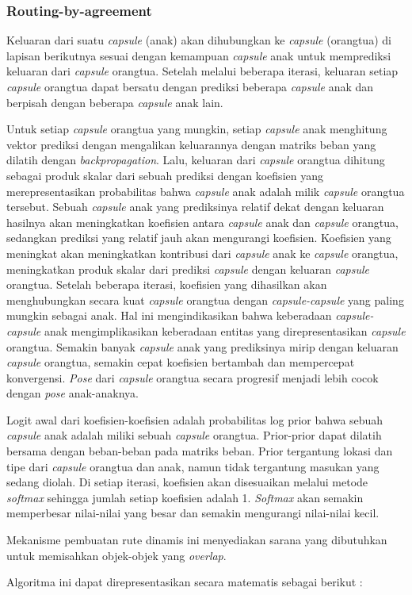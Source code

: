 \documentclass{article}
\begin{document}
	   	\subsubsection{Routing-by-agreement}
	   	Keluaran dari suatu \textit{capsule} (anak) akan dihubungkan ke \textit{capsule} (orangtua) di lapisan berikutnya sesuai dengan kemampuan \textit{capsule} anak untuk memprediksi keluaran dari \textit{capsule} orangtua. Setelah melalui beberapa iterasi, keluaran setiap \textit{capsule} orangtua dapat bersatu dengan prediksi beberapa \textit{capsule} anak dan berpisah dengan beberapa \textit{capsule} anak lain. 
	   	\par
	   	Untuk setiap \textit{capsule} orangtua yang mungkin, setiap \textit{capsule} anak menghitung vektor prediksi dengan mengalikan keluarannya dengan matriks beban yang dilatih dengan \textit{backpropagation}. Lalu, keluaran dari \textit{capsule} orangtua dihitung sebagai produk skalar dari sebuah prediksi dengan koefisien yang merepresentasikan probabilitas bahwa \textit{capsule} anak  adalah milik \textit{capsule} orangtua tersebut. Sebuah \textit{capsule} anak yang prediksinya relatif dekat dengan keluaran hasilnya akan meningkatkan koefisien antara \textit{capsule} anak dan \textit{capsule} orangtua, sedangkan prediksi yang relatif jauh akan mengurangi koefisien. Koefisien yang meningkat akan meningkatkan kontribusi dari \textit{capsule} anak ke \textit{capsule} orangtua, meningkatkan produk skalar dari prediksi \textit{capsule} dengan keluaran \textit{capsule} orangtua. Setelah beberapa iterasi, koefisien yang dihasilkan akan menghubungkan secara kuat \textit{capsule} orangtua dengan \textit{capsule-capsule} yang paling mungkin sebagai anak. Hal ini mengindikasikan bahwa keberadaan \textit{capsule-capsule} anak mengimplikasikan keberadaan entitas yang direpresentasikan \textit{capsule} orangtua. Semakin banyak \textit{capsule} anak yang prediksinya mirip dengan keluaran \textit{capsule} orangtua, semakin cepat koefisien bertambah dan mempercepat konvergensi. \textit{Pose} dari \textit{capsule} orangtua secara progresif menjadi lebih cocok dengan \textit{pose} anak-anaknya. 
	   	\par
	   	Logit awal dari koefisien-koefisien adalah probabilitas log prior bahwa sebuah \textit{capsule} anak adalah miliki sebuah \textit{capsule} orangtua. Prior-prior dapat dilatih bersama dengan beban-beban pada matriks beban. Prior tergantung lokasi dan tipe dari \textit{capsule} orangtua dan anak, namun tidak tergantung masukan yang sedang diolah. Di setiap iterasi, koefisien akan disesuaikan melalui metode \textit{softmax} sehingga jumlah setiap koefisien adalah 1. \textit{Softmax} akan semakin memperbesar nilai-nilai yang besar dan semakin mengurangi nilai-nilai kecil.
	   	\par
	   	Mekanisme pembuatan rute dinamis ini menyediakan sarana yang dibutuhkan untuk memisahkan objek-objek yang \textit{overlap}. 
	   	\par 
	   	Algoritma ini dapat direpresentasikan secara matematis sebagai berikut : 
	   	
\end{document}
